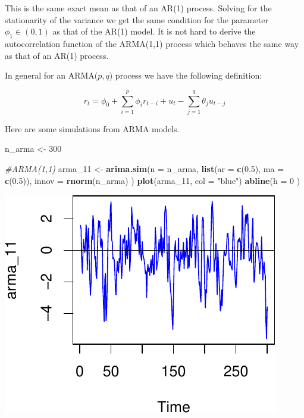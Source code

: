 \documentclass[11pt,]{article}
\newenvironment{Shaded}{\begin{snugshade}}{\end{snugshade}}
\newcommand{\KeywordTok}[1]{\textcolor[rgb]{0.13,0.29,0.53}{\textbf{#1}}}
\newcommand{\DataTypeTok}[1]{\textcolor[rgb]{0.13,0.29,0.53}{#1}}
\newcommand{\DecValTok}[1]{\textcolor[rgb]{0.00,0.00,0.81}{#1}}
\newcommand{\FloatTok}[1]{\textcolor[rgb]{0.00,0.00,0.81}{#1}}
\newcommand{\StringTok}[1]{\textcolor[rgb]{0.31,0.60,0.02}{#1}}
\newcommand{\CommentTok}[1]{\textcolor[rgb]{0.56,0.35,0.01}{\textit{#1}}}
\newcommand{\NormalTok}[1]{#1}
\begin{document}
This is the same exact mean as that of an AR(1) process. Solving for the
stationarity of the variance we get the same condition for the parameter
\(\phi_1\in (0,1)\) as that of the AR(1) model. It is not hard to derive
the autocorrelation function of the ARMA(1,1) process which behaves the
same way as that of an AR(1) process.

In general for an ARMA(\(p, q\)) process we have the following
definition:

\[r_t = \phi_0 + \sum_{i=1}^p \phi_ir_{t-i}+u_t-\sum_{j=1}^q \theta_ju_{t-j}\]

Here are some simulations from ARMA models.

\begin{Shaded}
\begin{Highlighting}[]
\NormalTok{n_arma <-}\StringTok{ }\DecValTok{300}

\CommentTok{#ARMA(1,1)}
\NormalTok{arma_}\DecValTok{11}\NormalTok{ <-}\StringTok{ }\KeywordTok{arima.sim}\NormalTok{(}\DataTypeTok{n =}\NormalTok{ n_arma, }
                     \KeywordTok{list}\NormalTok{(}\DataTypeTok{ar =} \KeywordTok{c}\NormalTok{(}\FloatTok{0.5}\NormalTok{), }\DataTypeTok{ma =} \KeywordTok{c}\NormalTok{(}\FloatTok{0.5}\NormalTok{)), }
                     \DataTypeTok{innov =} \KeywordTok{rnorm}\NormalTok{(n_arma)}
\NormalTok{                     )}
\KeywordTok{plot}\NormalTok{(arma_}\DecValTok{11}\NormalTok{, }\DataTypeTok{col =} \StringTok{"blue"}\NormalTok{)}
\KeywordTok{abline}\NormalTok{(}\DataTypeTok{h =} \DecValTok{0}\NormalTok{ )}
\end{Highlighting}
\end{Shaded}

\begin{center}\includegraphics{FMC_T4_PhD_ARMA_GARCH_files/figure-latex/ARMA_sim-1} \end{center}
\end{document}
